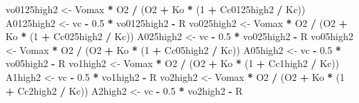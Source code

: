 \documentclass[
]{krantz}
\makeatletter
\newenvironment{Shaded}{\begin{snugshade}}{\end{snugshade}}
\newcommand{\DecValTok}[1]{\textcolor[rgb]{0.00,0.00,0.81}{#1}}
\newcommand{\FloatTok}[1]{\textcolor[rgb]{0.00,0.00,0.81}{#1}}
\newcommand{\NormalTok}[1]{#1}
\newcommand{\OperatorTok}[1]{\textcolor[rgb]{0.81,0.36,0.00}{\textbf{#1}}}
\newcommand{\StringTok}[1]{\textcolor[rgb]{0.31,0.60,0.02}{#1}}
\newenvironment{kframe}{%
\medskip{}
\setlength{\fboxsep}{.8em}
 \def\at@end@of@kframe{}%
 \ifinner\ifhmode%
  \def\at@end@of@kframe{\end{minipage}}%
  \begin{minipage}{\columnwidth}%
 \fi\fi%
 \def\FrameCommand##1{\hskip\@totalleftmargin \hskip-\fboxsep
 \colorbox{shadecolor}{##1}\hskip-\fboxsep
     \hskip-\linewidth \hskip-\@totalleftmargin \hskip\columnwidth}%
 \MakeFramed {\advance\hsize-\width
   \@totalleftmargin\z@ \linewidth\hsize
   \@setminipage}}%
 {\par\unskip\endMakeFramed%
 \at@end@of@kframe}
\renewenvironment{Shaded}{\begin{kframe}}{\end{kframe}}
\makeatother
\begin{document}
\begin{Shaded}
\begin{Highlighting}[]
\NormalTok{vo0125high2 \textless{}{-}}\StringTok{ }\NormalTok{Vomax }\OperatorTok{*}\StringTok{ }\NormalTok{O2 }\OperatorTok{/}\StringTok{ }\NormalTok{(O2 }\OperatorTok{+}\StringTok{ }\NormalTok{Ko }\OperatorTok{*}\StringTok{ }\NormalTok{(}\DecValTok{1} \OperatorTok{+}\StringTok{ }\NormalTok{Cc0125high2 }\OperatorTok{/}\StringTok{ }\NormalTok{Kc)) }
\NormalTok{A0125high2 \textless{}{-}}\StringTok{ }\NormalTok{vc }\OperatorTok{{-}}\StringTok{ }\FloatTok{0.5} \OperatorTok{*}\StringTok{ }\NormalTok{vo0125high2 }\OperatorTok{{-}}\StringTok{ }\NormalTok{R }
\NormalTok{vo025high2 \textless{}{-}}\StringTok{ }\NormalTok{Vomax }\OperatorTok{*}\StringTok{ }\NormalTok{O2 }\OperatorTok{/}\StringTok{ }\NormalTok{(O2 }\OperatorTok{+}\StringTok{ }\NormalTok{Ko }\OperatorTok{*}\StringTok{ }\NormalTok{(}\DecValTok{1} \OperatorTok{+}\StringTok{ }\NormalTok{Cc025high2 }\OperatorTok{/}\StringTok{ }\NormalTok{Kc)) }
\NormalTok{A025high2 \textless{}{-}}\StringTok{ }\NormalTok{vc }\OperatorTok{{-}}\StringTok{ }\FloatTok{0.5} \OperatorTok{*}\StringTok{ }\NormalTok{vo025high2 }\OperatorTok{{-}}\StringTok{ }\NormalTok{R }
\NormalTok{vo05high2 \textless{}{-}}\StringTok{ }\NormalTok{Vomax }\OperatorTok{*}\StringTok{ }\NormalTok{O2 }\OperatorTok{/}\StringTok{ }\NormalTok{(O2 }\OperatorTok{+}\StringTok{ }\NormalTok{Ko }\OperatorTok{*}\StringTok{ }\NormalTok{(}\DecValTok{1} \OperatorTok{+}\StringTok{ }\NormalTok{Cc05high2 }\OperatorTok{/}\StringTok{ }\NormalTok{Kc)) }
\NormalTok{A05high2 \textless{}{-}}\StringTok{ }\NormalTok{vc }\OperatorTok{{-}}\StringTok{ }\FloatTok{0.5} \OperatorTok{*}\StringTok{ }\NormalTok{vo05high2 }\OperatorTok{{-}}\StringTok{ }\NormalTok{R }
\NormalTok{vo1high2 \textless{}{-}}\StringTok{ }\NormalTok{Vomax }\OperatorTok{*}\StringTok{ }\NormalTok{O2 }\OperatorTok{/}\StringTok{ }\NormalTok{(O2 }\OperatorTok{+}\StringTok{ }\NormalTok{Ko }\OperatorTok{*}\StringTok{ }\NormalTok{(}\DecValTok{1} \OperatorTok{+}\StringTok{ }\NormalTok{Cc1high2 }\OperatorTok{/}\StringTok{ }\NormalTok{Kc)) }
\NormalTok{A1high2 \textless{}{-}}\StringTok{ }\NormalTok{vc }\OperatorTok{{-}}\StringTok{ }\FloatTok{0.5} \OperatorTok{*}\StringTok{ }\NormalTok{vo1high2 }\OperatorTok{{-}}\StringTok{ }\NormalTok{R }
\NormalTok{vo2high2 \textless{}{-}}\StringTok{ }\NormalTok{Vomax }\OperatorTok{*}\StringTok{ }\NormalTok{O2 }\OperatorTok{/}\StringTok{ }\NormalTok{(O2 }\OperatorTok{+}\StringTok{ }\NormalTok{Ko }\OperatorTok{*}\StringTok{ }\NormalTok{(}\DecValTok{1} \OperatorTok{+}\StringTok{ }\NormalTok{Cc2high2 }\OperatorTok{/}\StringTok{ }\NormalTok{Kc)) }
\NormalTok{A2high2 \textless{}{-}}\StringTok{ }\NormalTok{vc }\OperatorTok{{-}}\StringTok{ }\FloatTok{0.5} \OperatorTok{*}\StringTok{ }\NormalTok{vo2high2 }\OperatorTok{{-}}\StringTok{ }\NormalTok{R }

\end{Highlighting}
\end{Shaded}
\end{document}
